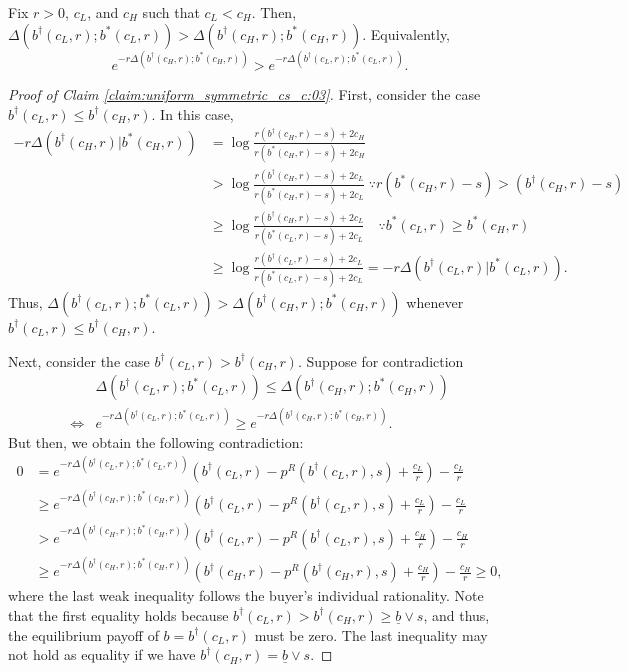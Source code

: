 \begin{appendices}
\begin{claim}\label{claim:uniform_symmetric_cs_c:03} 
Fix $r>0$, $c_L$, and $c_H$ such that $c_L<c_H$. Then, $\Delta(b^\dagger(c_L,r);b^*(c_L,r)) > \Delta(b^\dagger(c_H,r);b^*(c_H,r))$. Equivalently,
    $$
    e^{-r\Delta(b^\dagger(c_H,r);b^*(c_H,r))}> e^{-r\Delta(b^\dagger(c_L,r);b^*(c_L,r))}.
    $$
\end{claim}

\begin{proof}[Proof of Claim \ref{claim:uniform_symmetric_cs_c:03}]
First, consider the case $b^\dagger(c_L, r) \leq b^\dagger(c_H, r)$. In this case, 
    \begin{align*}
    -r\Delta(b^\dagger(c_H, r)|b^*(c_H, r))
    &=\log\frac{r(b^\dagger(c_H, r)-s)+2c_H}{r(b^*(c_H, r)-s)+2c_H}
    \\
    &> \log\frac{r(b^\dagger(c_H, r)-s)+2c_L}{r(b^*(c_H, r)-s)+2c_L} \;\because r(b^*(c_H, r)-s)> (b^\dagger(c_H, r)-s)
    \\
    &\geq \log\frac{r(b^\dagger(c_H, r)-s)+2c_L}{r(b^*(c_L, r)-s)+2c_L} \quad \because b^*(c_L, r) \geq b^*(c_H, r)
    \\
    &\geq \log\frac{r(b^\dagger(c_L, r)-s)+2c_L}{r(b^*(c_L, r)-s)+2c_L} = -r\Delta(b^\dagger(c_L, r)|b^*(c_L, r)). 
    \end{align*} 
Thus, $\Delta(b^\dagger(c_L, r);b^*(c_L, r)) > \Delta(b^\dagger(c_H, r);b^*(c_H, r))$ whenever $b^\dagger(c_L, r) \leq b^\dagger(c_H, r)$. 

Next, consider the case $b^\dagger(c_L, r) > b^\dagger(c_H, r)$. Suppose for contradiction 
    \begin{align*}
    &\Delta(b^\dagger(c_L, r);b^*(c_L, r)) \leq \Delta(b^\dagger(c_H, r);b^*(c_H, r)) 
    \\
    \iff&
    e^{-r\Delta(b^\dagger(c_L, r);b^*(c_L, r))} \geq e^{-r\Delta(b^\dagger(c_H, r);b^*(c_H, r))}.
    \end{align*}
But then, we obtain the following contradiction: 
    \begin{align*}
    0&=e^{-r\Delta(b^\dagger(c_L, r);b^*(c_L, r))}\left(b^\dagger(c_L, r)-p^R(b^\dagger(c_L, r),s)+\frac{c_L}{r}\right)-\frac{c_L}{r}
    \\
    &\geq e^{-r\Delta(b^\dagger(c_H, r);b^*(c_H, r))}\left(b^\dagger(c_L, r)-p^R(b^\dagger(c_L, r),s)+\frac{c_L}{r}\right)-\frac{c_L}{r}
    \\
    &> e^{-r\Delta(b^\dagger(c_H, r);b^*(c_H, r))}\left(b^\dagger(c_L, r)-p^R(b^\dagger(c_L, r),s)+\frac{c_H}{r}\right)-\frac{c_H}{r} 
    \\
    &\geq e^{-r\Delta(b^\dagger(c_H, r);b^*(c_H, r))}\left(b^\dagger(c_H, r)-p^R(b^\dagger(c_H, r),s)+\frac{c_H}{r}\right)-\frac{c_H}{r} \geq 0, 
    \end{align*}
where the last weak inequality follows the buyer's individual rationality. Note that the first equality holds because $b^\dagger(c_L, r) > b^\dagger(c_H, r)\geq\underline b\vee s$, and thus, the equilibrium payoff of $b=b^\dagger(c_L, r)$ must be zero. The last inequality may not hold as equality if we have $b^\dagger(c_H, r)=\underline b\vee s$. 
\end{proof}


\end{appendices}

